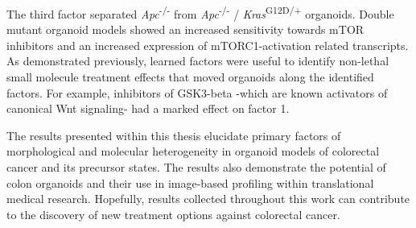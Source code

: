 The third factor separated \textit{Apc}\textsuperscript{-/-} from \textit{Apc}\textsuperscript{-/-} / \textit{Kras}\textsuperscript{G12D/+} organoids. Double mutant organoid models showed an increased sensitivity towards mTOR inhibitors and an increased expression of mTORC1-activation related transcripts. As demonstrated previously, learned factors were useful to identify non-lethal small molecule treatment effects that moved organoids along the identified factors. For example, inhibitors of GSK3-beta -which are known activators of canonical Wnt signaling- had a marked effect on factor 1. 
\bigbreak

The results presented within this thesis elucidate primary factors of morphological and molecular heterogeneity in organoid models of colorectal cancer and its precursor states. The results also demonstrate the potential of colon organoids and their use in image-based profiling within translational medical research. Hopefully, results collected throughout this work can contribute to the discovery of new treatment options against colorectal cancer. 
